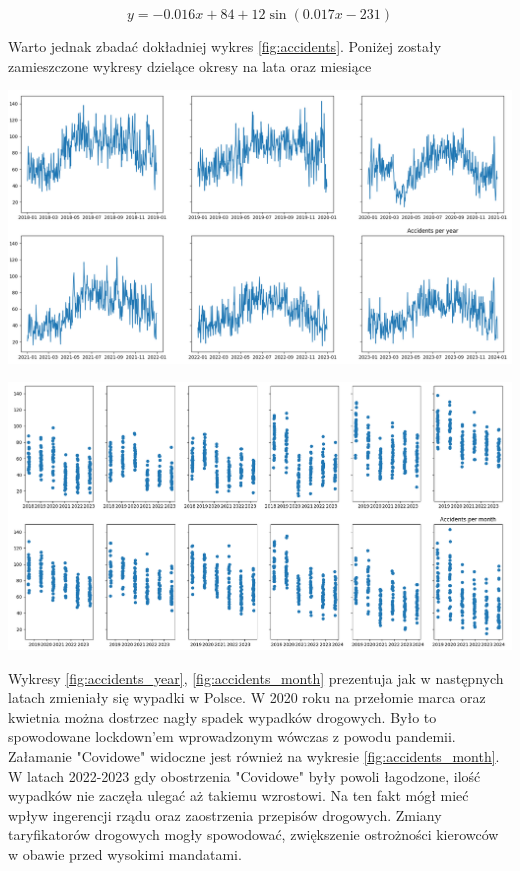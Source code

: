 \documentclass{article}
\begin{document}
\begin{equation} \label{eq:sin_equation}
    y = -0.016x + 84 + 12\sin(0.017x - 231) 
\end{equation}

Warto jednak zbadać dokładniej wykres \ref{fig:accidents}. Poniżej zostały zamieszczone wykresy dzielące okresy na lata oraz miesiące

\begin{center}
    \includegraphics[scale=0.3]{visualization/accidents_per_year.png}
    \captionsetup{hypcap=false}
    \label{fig:accidents_year}
\end{center}

\begin{center}
    \includegraphics[scale=0.3]{visualization/accidents_per_month.png}
    \captionsetup{hypcap=false}
    \label{fig:accidents_month}
\end{center}

Wykresy \ref{fig:accidents_year}, \ref{fig:accidents_month} prezentuja jak w następnych latach zmieniały się wypadki w Polsce. W 2020 roku na przełomie marca oraz kwietnia można dostrzec nagły spadek wypadków drogowych. Było to spowodowane lockdown'em wprowadzonym wówczas z powodu pandemii. Załamanie "Covidowe" widoczne jest również na wykresie \ref{fig:accidents_month}. 
W latach 2022-2023 gdy obostrzenia "Covidowe" były powoli łagodzone, ilość wypadków nie zaczęła ulegać aż takiemu wzrostowi. Na ten fakt mógł mieć wpływ ingerencji rządu oraz zaostrzenia przepisów drogowych. Zmiany taryfikatorów drogowych mogły spowodować, zwiększenie ostrożności kierowców w obawie przed wysokimi mandatami.
\end{document}
